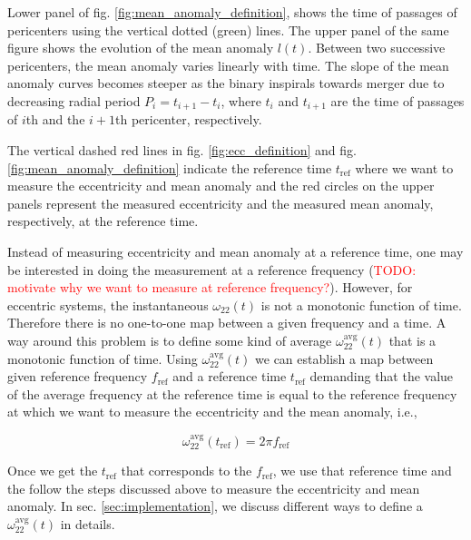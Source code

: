 \documentclass[aps,prd,amsmath,floats,floatfix, twocolumn,
superscriptaddress,nofootinbib,showpacs]{revtex4-1}
\newcommand{\red}{\textcolor{red}}
\newcommand{\TODO}[1]{\red{TODO: #1}}
\begin{document}
Lower panel of fig. \ref{fig:mean_anomaly_definition}, shows the time
of passages of pericenters using the vertical dotted (green)
lines. The upper panel of the same figure shows the evolution of the
mean anomaly $l(t)$. Between two successive pericenters, the mean
anomaly varies linearly with time. The slope of the mean anomaly
curves becomes steeper as the binary inspirals towards merger due to
decreasing radial period $P_{i} = t_{i+1} - t_i$, where $t_{i}$ and
$t_{i+1}$ are the time of passages of $i$th and the $i+1$th
pericenter, respectively.

The vertical dashed red lines in fig. \ref{fig:ecc_definition} and
fig. \ref{fig:mean_anomaly_definition} indicate the reference time
$t_{\text{ref}}$ where we want to measure the eccentricity and mean
anomaly and the red circles on the upper panels represent the measured
eccentricity and the measured mean anomaly, respectively, at the
reference time.

Instead of measuring eccentricity and mean anomaly at a reference
time, one may be interested in doing the measurement at a reference
frequency (\TODO{motivate why we want to measure at reference
frequency?}). However, for eccentric systems, the instantaneous
$\omega_{22}(t)$ is not a monotonic function of time. Therefore there
is no one-to-one map between a given frequency and a time. A way
around this problem is to define some kind of average
$\omega^{\text{avg}}_{22}(t)$ that is a monotonic function of
time. Using $\omega^{\text{avg}}_{22}(t)$ we can establish a map
between given reference frequency $f_{\text{ref}}$ and a reference
time $t_{\text{ref}}$ demanding that the value of the average
frequency at the reference time is equal to the reference frequency at
which we want to measure the eccentricity and the mean anomaly, i.e.,

\begin{equation}
  \label{eq:map-between-ref-freq-and-ref-time}
  \omega^{\text{avg}}_{22}(t_{\text{ref}}) = 2 \pi f_{\text{ref}}
\end{equation}

Once we get the $t_{\text{ref}}$ that corresponds to the
$f_{\text{ref}}$, we use that reference time and the follow the steps
discussed above to measure the eccentricity and mean anomaly. In
sec. \ref{sec:implementation}, we discuss different ways to define a
$\omega^{\text{avg}}_{22}(t)$ in details.
\end{document}
